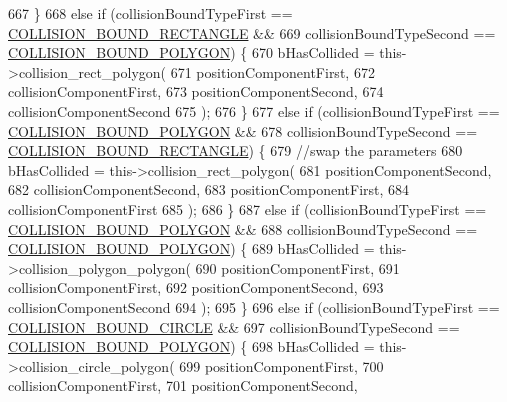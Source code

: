 \begin{DoxyCode}
667             \}
668             \textcolor{keywordflow}{else} \textcolor{keywordflow}{if} (collisionBoundTypeFirst == \hyperlink{_a_e___attributes_8h_a3a31a6297a55375fdc090f881de08327}{COLLISION\_BOUND\_RECTANGLE} &&
669                 collisionBoundTypeSecond == \hyperlink{_a_e___attributes_8h_a71ab491ab7b44947b07d7b05974387d9}{COLLISION\_BOUND\_POLYGON}) \{
670                 bHasCollided = this->collision\_rect\_polygon(
671                     positionComponentFirst,
672                     collisionComponentFirst,
673                     positionComponentSecond,
674                     collisionComponentSecond
675                     );
676             \}
677             \textcolor{keywordflow}{else} \textcolor{keywordflow}{if} (collisionBoundTypeFirst == \hyperlink{_a_e___attributes_8h_a71ab491ab7b44947b07d7b05974387d9}{COLLISION\_BOUND\_POLYGON} &&
678                 collisionBoundTypeSecond == \hyperlink{_a_e___attributes_8h_a3a31a6297a55375fdc090f881de08327}{COLLISION\_BOUND\_RECTANGLE}) \{
679                     \textcolor{comment}{//swap the parameters}
680                 bHasCollided = this->collision\_rect\_polygon(
681                     positionComponentSecond,
682                     collisionComponentSecond,
683                     positionComponentFirst,
684                     collisionComponentFirst
685                     );
686             \}
687             \textcolor{keywordflow}{else} \textcolor{keywordflow}{if} (collisionBoundTypeFirst == \hyperlink{_a_e___attributes_8h_a71ab491ab7b44947b07d7b05974387d9}{COLLISION\_BOUND\_POLYGON} &&
688                 collisionBoundTypeSecond == \hyperlink{_a_e___attributes_8h_a71ab491ab7b44947b07d7b05974387d9}{COLLISION\_BOUND\_POLYGON}) \{
689                 bHasCollided = this->collision\_polygon\_polygon(
690                     positionComponentFirst,
691                     collisionComponentFirst,
692                     positionComponentSecond,
693                     collisionComponentSecond
694                     );
695             \}
696             \textcolor{keywordflow}{else} \textcolor{keywordflow}{if} (collisionBoundTypeFirst == \hyperlink{_a_e___attributes_8h_a50b28a4aee049371f130f3eafa9c942f}{COLLISION\_BOUND\_CIRCLE} &&
697                 collisionBoundTypeSecond == \hyperlink{_a_e___attributes_8h_a71ab491ab7b44947b07d7b05974387d9}{COLLISION\_BOUND\_POLYGON}) \{
698                 bHasCollided = this->collision\_circle\_polygon(
699                     positionComponentFirst,
700                     collisionComponentFirst,
701                     positionComponentSecond,

\end{DoxyCode}
